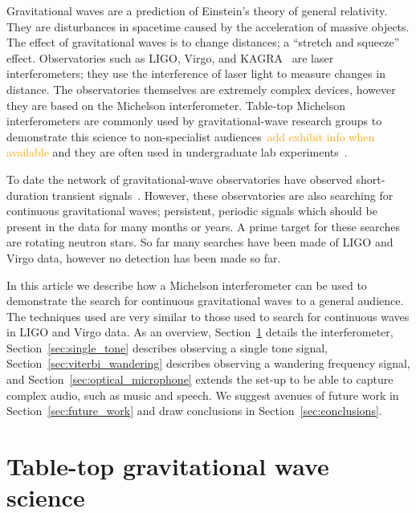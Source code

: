 \documentclass[prb,preprint]{revtex4-1}
\newcommand{\han}{\textcolor{orange}}
\begin{document}
Gravitational waves are a prediction of Einstein's theory of general relativity. 
They are disturbances in spacetime caused by the acceleration of massive objects. 
The effect of gravitational waves is to change distances; a ``stretch and squeeze'' effect. 
Observatories such as LIGO, Virgo, and KAGRA~\cite{KAGRA:2013} are laser interferometers; they use the interference of laser light to measure changes in distance. 
The observatories themselves are extremely complex devices, however they are based on the Michelson interferometer. 
Table-top Michelson interferometers are commonly used by gravitational-wave research groups to demonstrate this science to non-specialist audiences~\cite{ThorLabsIFO,NikhefIFO}\han{add exhibit info when available} and they are often used in undergraduate lab experiments~\cite{UgoliniEtAl:2019}. 


To date the network of gravitational-wave observatories have observed short-duration transient signals~\cite{GWTC-1:2018,GWOSC:online}. 
However, these observatories are also searching for continuous gravitational waves; persistent, periodic signals which should be present in the data for many months or years. 
A prime target for these searches are rotating neutron stars. 
So far many searches have been made of LIGO and Virgo data, however no detection has been made so far.


In this article we describe how a Michelson interferometer can be used to demonstrate the search for continuous gravitational waves to a general audience. 
The techniques used are very similar to those used to search for continuous waves in LIGO and Virgo data.
As an overview, Section~\ref{sec:ifo} details the interferometer, Section~\ref{sec:single_tone} describes observing a single tone signal, Section~\ref{sec:viterbi_wandering} describes observing a wandering frequency signal, and Section~\ref{sec:optical_microphone} extends the set-up to be able to capture complex audio, such as music and speech. We suggest avenues of future work in Section~\ref{sec:future_work} and draw conclusions in Section~\ref{sec:conclusions}.


\section{Table-top gravitational wave science}
\label{sec:ifo}
\end{document}
